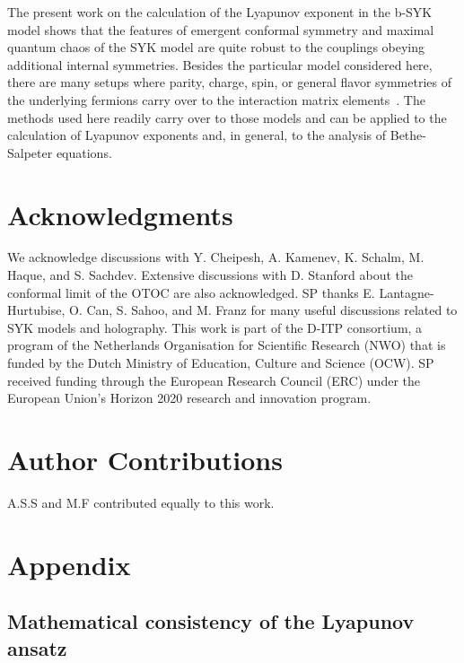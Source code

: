 The present work on the calculation of the Lyapunov exponent in the b-SYK model shows that the features of emergent conformal symmetry and maximal quantum chaos of the SYK model are quite robust to the couplings obeying additional internal symmetries.
Besides the particular model considered here, there are many setups where parity, charge, spin,
or general flavor symmetries of the underlying fermions carry over to the interaction matrix elements~\cite{Chowdhury-RMP2022,Franz2018-review,Kim2019,sahoo_traversable_2020,xu_sparse_2020}.
The methods used here readily carry over to those models and can be applied to the calculation of Lyapunov exponents and, in general, to the analysis of Bethe-Salpeter equations.


\section*{Acknowledgments}
	We acknowledge discussions with Y. Cheipesh, A. Kamenev, K. Schalm, M. Haque, and S. Sachdev. Extensive discussions with D. Stanford about the conformal limit of the OTOC are also acknowledged.
	SP thanks E. Lantagne-Hurtubise, O. Can, S. Sahoo, and M. Franz for many useful discussions related to SYK models and holography.  This work is part of the D-ITP consortium,
	a program of the Netherlands Organisation for Scientific Research (NWO) that is funded by the Dutch Ministry of Education, Culture and Science (OCW).
	SP received funding through the European Research Council (ERC) under the European Union's Horizon 2020 research and innovation program.


\section*{Author Contributions}
A.S.S and M.F contributed equally to this work.

\newpage
\section{Appendix}

\subsection{Mathematical consistency of the Lyapunov ansatz}
\label{sec:technical_explanation}

